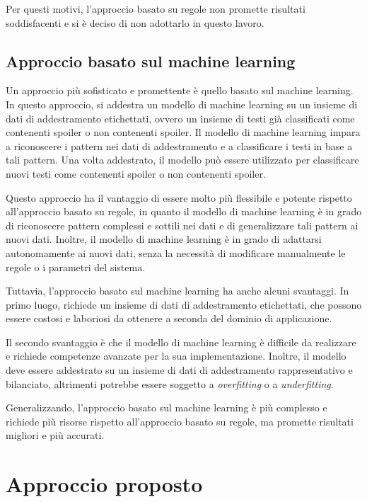 Per questi motivi, l'approccio basato su regole non
promette risultati soddisfacenti e si è deciso di non
adottarlo in questo lavoro.

\subsection{Approccio basato sul machine learning}
\label{subsec:approccio-ml}

Un approccio più sofisticato e promettente è quello basato
sul machine learning.
In questo approccio, si addestra un modello di machine
learning su un insieme di dati di addestramento
etichettati, ovvero un insieme di testi già classificati
come contenenti spoiler o non contenenti spoiler.
Il modello di machine learning impara a riconoscere i
pattern nei dati di addestramento e a classificare i testi
in base a tali pattern.
Una volta addestrato, il modello può essere utilizzato per
classificare nuovi testi come contenenti spoiler o non
contenenti spoiler.

Questo approccio ha il vantaggio di essere molto più
flessibile e potente rispetto all'approccio basato su
regole, in quanto il modello di machine learning è in grado
di riconoscere pattern complessi e sottili nei dati e di
generalizzare tali pattern ai nuovi dati.
Inoltre, il modello di machine learning è in grado di
adattarsi autonomamente ai nuovi dati, senza la necessità
di modificare manualmente le regole o i parametri del
sistema.

Tuttavia, l'approccio basato sul machine learning ha anche
alcuni svantaggi.
In primo luogo, richiede un insieme di dati di
addestramento etichettati, che possono essere costosi e
laboriosi da ottenere a seconda del dominio di
applicazione.

Il secondo svantaggio è che il modello di machine learning
è difficile da realizzare e richiede competenze avanzate
per la sua implementazione.
Inoltre, il modello deve essere addestrato su un insieme di
dati di addestramento rappresentativo e bilanciato,
altrimenti potrebbe essere soggetto a \textit{overfitting}
o a \textit{underfitting}.

Generalizzando, l'approccio basato sul machine learning è
più complesso e richiede più risorse rispetto all'approccio
basato su regole, ma promette risultati migliori e più
accurati.

\section{Approccio proposto}
\label{sec:approccio-proposto}

